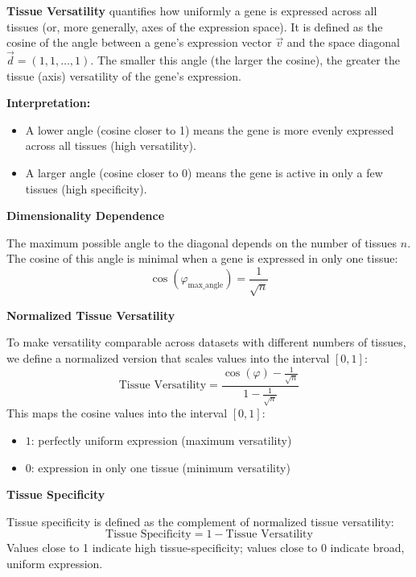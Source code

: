 \documentclass[11pt]{article}
\begin{document}
\textbf{Tissue Versatility} quantifies how uniformly a gene is expressed across
all tissues (or, more generally, axes of the expression space). It is defined
as the cosine of the angle between a gene's expression vector $\vec{v}$ and
the space diagonal $\vec{d}= (1, 1, \dots, 1)$. The smaller this angle (the
larger the cosine), the greater the tissue (axis) versatility of the gene's
expression.

\vspace{0.5cm}
\noindent
\textbf{Interpretation:}
\begin{itemize}
	\item A lower angle (cosine closer to 1) means the gene is more evenly expressed
	      across all tissues (high versatility).
	      
	\item A larger angle (cosine closer to 0) means the gene is active in only a
	      few tissues (high specificity).
\end{itemize}

\noindent
\textbf{Dimensionality Dependence}

\vspace{0.1cm}
\noindent
The maximum possible angle to the diagonal depends on the number of tissues
$n$. The cosine of this angle is minimal when a gene is expressed in only one tissue:
\[
	\cos(\varphi_{\text{max\_angle}}) = \frac{1}{\sqrt{n}}
\]

\noindent
\textbf{Normalized Tissue Versatility}

\vspace{0.1cm}
\noindent
To make versatility comparable across datasets with different numbers of tissues,
we define a normalized version that scales values into the interval $[0, 1]$:
\[
	\text{Tissue Versatility}= \frac{\cos(\varphi) - \frac{1}{\sqrt{n}}}{1 -
		\frac{1}{\sqrt{n}}}
\]
This maps the cosine values into the interval $[0, 1]$:
\begin{itemize}
	\item $1$: perfectly uniform expression (maximum versatility)
	      
	\item $0$: expression in only one tissue (minimum versatility)
\end{itemize}

\noindent
\textbf{Tissue Specificity}

\vspace{0.1cm}
\noindent
Tissue specificity is defined as the complement of normalized tissue versatility:
\[
	\text{Tissue Specificity}= 1 - \text{Tissue Versatility}
\]
Values close to 1 indicate high tissue-specificity; values close to 0 indicate
broad, uniform expression.
\end{document}
